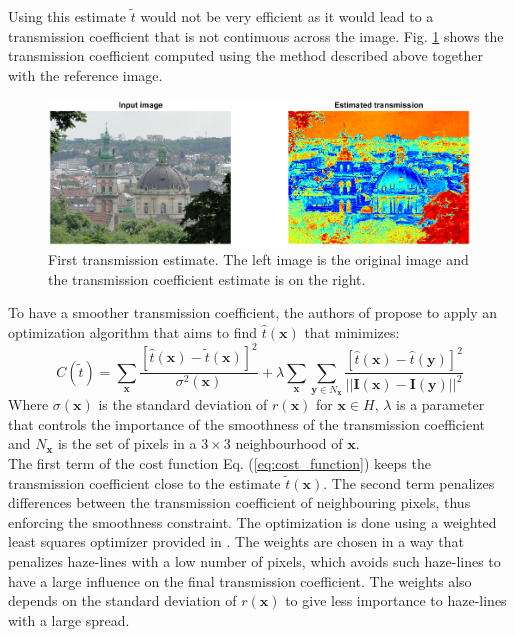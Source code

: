 \documentclass[conference]{IEEEtran}
\begin{document}
Using this estimate $\tilde{t}$ would not be very efficient as it would lead to a transmission coefficient that is not continuous across the image. Fig. \ref{fig:first_transmission} shows the transmission coefficient computed using the method described above together with the reference image.\par
\begin{figure}
    \centering
    \includegraphics[width=\linewidth]{img/noOpti.png}
    \caption{First transmission estimate. The left image is the original image and the transmission coefficient estimate is on the right.}
    \label{fig:first_transmission}
\end{figure}
To have a smoother transmission coefficient, the authors of \cite{dehaze} propose to apply an optimization algorithm that aims to find $\hat{t}(\mathbf{x})$ that minimizes:
\begin{equation}
    \label{eq:cost_function}
    C(\tilde{t}) = \sum_{\mathbf{x}} \frac{\left[\hat{t}(\mathbf{x}) - \tilde{t}(\mathbf{x})\right]^2}{\sigma^2(\mathbf{x})} + \lambda \sum_{\mathbf{x}} \sum_{\mathbf{y} \in N_{\mathbf{x}}} \frac{\left[\hat{t}(\mathbf{x}) - \hat{t}(\mathbf{y})\right]^2}{||\mathbf{I}(\mathbf{x}) - \mathbf{I}(\mathbf{y})||^2}
\end{equation}
Where $\sigma(\mathbf{x})$ is the standard deviation of $r(\mathbf{x})$ for $\mathbf{x} \in H$, $\lambda$ is a parameter that controls the importance of the smoothness of the transmission coefficient and $N_{\mathbf{x}}$ is the set of pixels in a $3 \times 3$ neighbourhood of $\mathbf{x}$.\\
The first term of the cost function Eq. (\ref{eq:cost_function}) keeps the transmission coefficient close to the estimate $\tilde{t}(\mathbf{x})$. The second term penalizes differences between the transmission coefficient of neighbouring pixels, thus enforcing the smoothness constraint. 
The optimization is done using a weighted least squares optimizer provided in \cite{github}. The weights are chosen in a way that penalizes haze-lines with a low number of pixels, which avoids such haze-lines to have a large influence on the final transmission coefficient. The weights also depends on the standard deviation of $r(\mathbf{x})$ to give less importance to haze-lines with a large spread. \par
\end{document}
